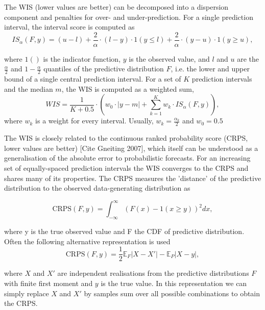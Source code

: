\documentclass{article}
\begin{document}
The WIS (lower values are better) can be decomposed into a dispersion component and penalties for over- and under-prediction. For a single prediction interval, the interval score is computed as 
\begin{equation}
 IS_\alpha(F,y) = (u-l) + \frac{2}{\alpha} \cdot (l-y) \cdot 1(y \leq l) + \frac{2}{\alpha} \cdot (y-u) \cdot 1(y \geq u),    
\end{equation}

where $1()$ is the indicator function, $y$ is the observed value, and $l$ and $u$ are the $\frac{\alpha}{2}$ and $1 - \frac{\alpha}{2}$ quantiles of the predictive distribution $F$, i.e. the lower and upper bound of a single central prediction interval. For a set of $K$ prediction intervals and the median $m$, the WIS is computed as a weighted sum, 
\begin{equation}
WIS = \frac{1}{K + 0.5} \cdot (w_0 \cdot |y - m| + \sum_{k = 1}^{K} w_k \cdot IS_{\alpha}(F, y)),    
\end{equation} 
where $w_k$ is a weight for every interval. Usually, $w_k = \frac{\alpha_k}{2}$ and $w_0 = 0.5$

The WIS is closely related to the continuous ranked probability score (CRPS, lower values are better) [Cite Gneiting 2007], which itself can be understood as a generalisation of the absolute error to probabilistic forecasts. For an increasing set of equally-spaced prediction intervals the WIS converges to the CRPS and shares many of its properties. The CRPS measures the 'distance' of the predictive distribution to the observed data-generating distribution as 



\begin{equation}
    \text{CRPS}(F, y) = \int_{-\infty}^\infty \left( F(x) - 1(x \geq y) \right)^2 dx,
\end{equation}

where y is the true observed value and F the CDF of predictive distribution. Often the following alternative representation is used
\begin{equation}
    \text{CRPS}(F, y) = \frac{1}{2} \mathbb{E}_{F} |X - X'| - \mathbb{E}_P |X - y|,
\end{equation}
  
where $X$ and $X'$ are independent realisations from the predictive distributions $F$ with finite first moment and $y$ is the true value. In this representation we can simply replace $X$ and $X'$ by samples sum over all possible combinations to obtain the CRPS.  
\end{document}
